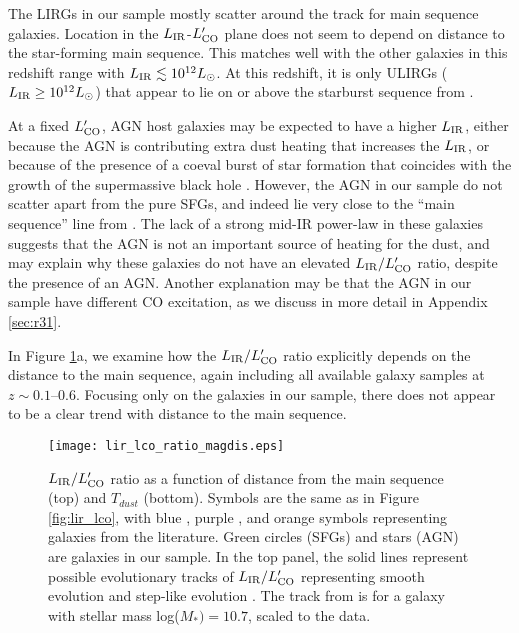 \documentclass[a4paper,fleqn,usenatbib]{mnras}
\newcommand{\lir}{L_{\rm{IR}}}
\newcommand{\lco}{L'_{\rm{CO}}}
\begin{document}
The LIRGs in our sample mostly scatter around the track for main sequence galaxies. Location in the $\lir$-$\lco$ plane does not seem to depend on distance to the star-forming main sequence. This matches well with the other galaxies in this redshift range with $\lir \lesssim 10^{12} L_{\odot}$. At this redshift, it is only ULIRGs ($\lir \geq 10^{12} L_{\odot}$) that appear to lie on or above the starburst sequence from \citet{2014ApJ...793...19S}. 

At a fixed $\lco$, AGN host galaxies may be expected to have a higher $\lir$, either because the AGN is contributing extra dust heating that increases the $\lir$, or because of the presence of a coeval burst of star formation that coincides with the growth of the supermassive black hole \citep[e.g.][]{2013ARA&A..51..105C}. However, the AGN in our sample do not scatter apart from the pure SFGs, and indeed lie very close to the ``main sequence'' line from \citet{2014ApJ...793...19S}.  The lack of a strong mid-IR power-law in these galaxies suggests that the AGN is not an important source of heating for the dust, and may explain why these galaxies do not have an elevated $\lir / \lco$ ratio, despite the presence of an AGN. Another explanation may be that the AGN in our sample have different CO excitation, as we discuss in more detail in Appendix \ref{sec:r31}. 

In Figure \ref{fig:lir_lco_ratio}a, we examine how the $\lir / \lco$ ratio explicitly depends on the distance to the main sequence, again including all available galaxy samples at $z \sim 0.1$--0.6. Focusing only on the galaxies in our sample, there does not appear to be a clear trend with distance to the main sequence. 

\begin{figure*}
\centering
\texttt{[image: lir\_lco\_ratio\_magdis.eps]}
\caption{$\lir / \lco$ ratio as a function of distance from the main sequence (top) and $T_{dust}$ (bottom). Symbols are the same as in Figure \ref{fig:lir_lco}, with blue \citep{2011A&A...528A.124C}, purple \citep{2013ApJ...768..132B}, and orange \citep{2014ApJ...796...63M} symbols representing galaxies from the literature.  Green circles (SFGs) and stars (AGN) are galaxies in our sample. In the top panel, the solid lines represent possible evolutionary tracks of $\lir/\lco$ representing smooth evolution \citep[black;][]{2012ApJ...760....6M} and step-like evolution \citep[red][]{2014ApJ...793...19S}.  The track from \citet{2014ApJ...793...19S} is for a galaxy with stellar mass log($M_{*}) = 10.7$, scaled to the data. }
\label{fig:lir_lco_ratio}
\end{figure*}
\end{document}
